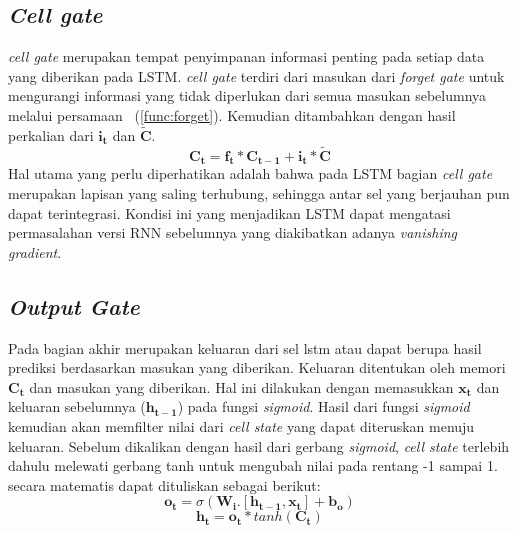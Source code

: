 \subsection{\textit{Cell gate}}
\textit{cell gate} merupakan tempat penyimpanan informasi penting pada setiap data yang diberikan pada LSTM. \textit{cell gate} terdiri dari masukan dari \textit{forget gate} untuk mengurangi informasi yang tidak diperlukan dari semua masukan sebelumnya melalui persamaan ~(\ref{func:forget}). Kemudian ditambahkan dengan hasil perkalian dari $\boldsymbol{i_t}$ dan $\boldsymbol{\tilde{C}}$.
\begin{equation}
	\boldsymbol{C_t} = \boldsymbol{f_t}*\boldsymbol{C_{t-1}} + \boldsymbol{i_t} * \boldsymbol{\tilde{C}}
	\label{func:cell_gate}
\end{equation}
Hal utama yang perlu diperhatikan adalah bahwa pada LSTM bagian \textit{cell gate} merupakan lapisan yang saling terhubung, sehingga antar sel yang berjauhan pun dapat terintegrasi. Kondisi ini yang menjadikan LSTM dapat mengatasi permasalahan versi RNN sebelumnya yang diakibatkan adanya \textit{vanishing gradient}.
\subsection{\textit{Output Gate}}
Pada bagian akhir merupakan keluaran dari sel lstm atau dapat berupa hasil prediksi berdasarkan masukan yang diberikan. Keluaran ditentukan oleh memori $\boldsymbol{C_t}$ dan masukan yang diberikan. Hal ini dilakukan dengan memasukkan  $\boldsymbol{x_t}$ dan keluaran sebelumnya ($\boldsymbol{h_{t-1}}$) pada fungsi \textit{sigmoid}. Hasil dari fungsi \textit{sigmoid} kemudian akan memfilter nilai dari \textit{cell state} yang dapat diteruskan menuju keluaran. Sebelum dikalikan dengan hasil dari gerbang \textit{sigmoid}, \textit{cell state} terlebih dahulu melewati gerbang tanh untuk mengubah nilai pada rentang -1 sampai 1. secara matematis dapat dituliskan sebagai berikut:
\begin{equation}
	\boldsymbol{o_t} = \sigma(\boldsymbol{W_i}.[\boldsymbol{h_{t-1}}, \boldsymbol{x_t}] + \boldsymbol{b_o})
	\label{func:ouput_sigmoid}
\end{equation}
\begin{equation}
	\boldsymbol{h_t} = \boldsymbol{o_t}*tanh(\boldsymbol{C_t})
	\label{func:final_output}
\end{equation}


